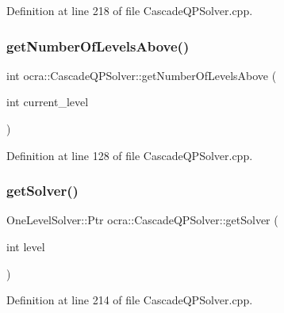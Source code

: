Definition at line 218 of file Cascade\+Q\+P\+Solver.\+cpp.

\hypertarget{classocra_1_1CascadeQPSolver_aa943fac9f6ab708fc0d5d80977878d20}{}\label{classocra_1_1CascadeQPSolver_aa943fac9f6ab708fc0d5d80977878d20} 
\subsubsection{\texorpdfstring{get\+Number\+Of\+Levels\+Above()}{getNumberOfLevelsAbove()}}
{\footnotesize\ttfamily int ocra\+::\+Cascade\+Q\+P\+Solver\+::get\+Number\+Of\+Levels\+Above (\begin{DoxyParamCaption}\item[{int}]{current\+\_\+level }\end{DoxyParamCaption})}



Definition at line 128 of file Cascade\+Q\+P\+Solver.\+cpp.

\hypertarget{classocra_1_1CascadeQPSolver_a7c0dff6ffa567d1bf6663bbc45fc22d4}{}\label{classocra_1_1CascadeQPSolver_a7c0dff6ffa567d1bf6663bbc45fc22d4} 
\subsubsection{\texorpdfstring{get\+Solver()}{getSolver()}}
{\footnotesize\ttfamily One\+Level\+Solver\+::\+Ptr ocra\+::\+Cascade\+Q\+P\+Solver\+::get\+Solver (\begin{DoxyParamCaption}\item[{int}]{level }\end{DoxyParamCaption})}



Definition at line 214 of file Cascade\+Q\+P\+Solver.\+cpp.

\hypertarget{classocra_1_1CascadeQPSolver_a2f433d5b3029e998396c7d40fba6caa5}{}\label{classocra_1_1CascadeQPSolver_a2f433d5b3029e998396c7d40fba6caa5} 
